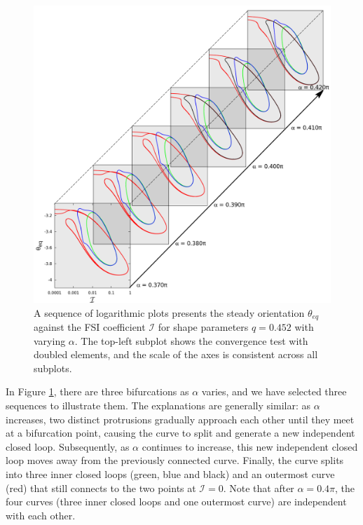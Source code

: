 \documentclass[lineno]{JFM-FLM_Au}
\begin{document}
\begin{figure}[!h]
\begin{minipage}{\linewidth}
	\end{minipage}
	\begin{minipage}{\linewidth}
		\centering
		\includegraphics[scale=0.15]{plot/elastic_beam_I_theta_q_0.452_alpha_restart3.png}
	\end{minipage}
	\caption{A sequence of logarithmic plots presents the steady orientation $\theta_{eq}$ against the FSI coefficient $\mathcal{I}$ for shape parameters $q = 0.452$ with varying $\alpha$. The top-left subplot shows the convergence test with doubled elements, and the scale of the axes is consistent across all subplots.}
	\label{fig:13}
\end{figure}
In Figure \ref{fig:13}, there are three bifurcations as $\alpha$ varies, and we have selected three sequences to illustrate them. The explanations are generally similar: as $\alpha$ increases, two distinct protrusions gradually approach each other until they meet at a bifurcation point, causing the curve to split and generate a new independent closed loop. Subsequently, as $\alpha$ continues to increase, this new independent closed loop moves away from the previously connected curve. Finally, the curve splits into three inner closed loops (green, blue and black) and an outermost curve (red) that still connects to the two points at $\mathcal{I} = 0$. Note that after $\alpha=0.4\pi$, the four curves (three inner closed loops and one outermost curve) are independent with each other.
\end{document}
